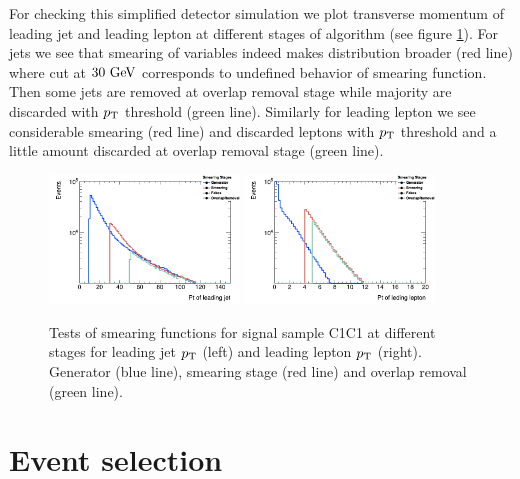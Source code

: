 \documentclass[tightenline,notitlepage,nofootinbib]{revtex4-1}
\begin{document}
For checking this simplified detector simulation we plot transverse momentum of leading jet and leading lepton at different stages of algorithm (see figure \cref{fig:check}). For jets we see that smearing of variables indeed makes distribution broader (red line) where cut at $30~\rm{GeV}$ corresponds to undefined behavior of smearing function. Then some jets are removed at overlap removal stage while majority are discarded with $p_{\rm T}$ threshold (green line). Similarly for leading lepton we see considerable smearing (red line) and discarded leptons with $p_{\rm T}$ threshold and a little amount discarded at overlap removal stage (green line). 
\begin{figure}[!ht]
  \centering
  \includegraphics[width=0.45\textwidth]{h_PtJets1stStages.png}
  \includegraphics[width=0.45\textwidth]{h_PtEleMuo1stStages.png}
  \caption{Tests of smearing functions for signal sample C1C1 at different stages for leading jet $p_{\rm T}$ (left) and leading lepton $p_{\rm T}$ (right). Generator (blue line), smearing stage (red line) and overlap removal (green line).}
  \label{fig:check}
\end{figure}


\section{Event selection}
\end{document}
